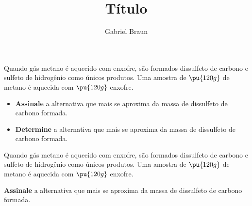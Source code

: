 \documentclass[braun, twocolumn]{braun}
\title{Título}
\affiliation{Colégio e Curso Pensi, Turma IME-ITA}
\author{Gabriel Braun}
\begin{document}
            \maketitle[botrule=false]
            
            \begin{problem}
                Quando gás metano é aquecido com enxofre, são formados dissulfeto de
carbono e sulfeto de hidrogênio como únicos produtos. Uma amostra de
\(\pu{120 g}\) de metano é aquecida com \(\pu{120 g}\) enxofre.

\begin{itemize}
\item
  \textbf{Assinale} a alternativa que mais se aproxima da massa de
  dissulfeto de carbono formada.
\item
  \textbf{Determine} a alternativa que mais se aproxima da massa de
  dissulfeto de carbono formada.
\end{itemize}
            \end{problem}
        

            \begin{problem}
                Quando gás metano é aquecido com enxofre, são formados dissulfeto de
carbono e sulfeto de hidrogênio como únicos produtos. Uma amostra de
\(\pu{120 g}\) de metano é aquecida com \(\pu{120 g}\) enxofre.

\textbf{Assinale} a alternativa que mais se aproxima da massa de
dissulfeto de carbono formada.
            \end{problem}
        
            
\end{document}

